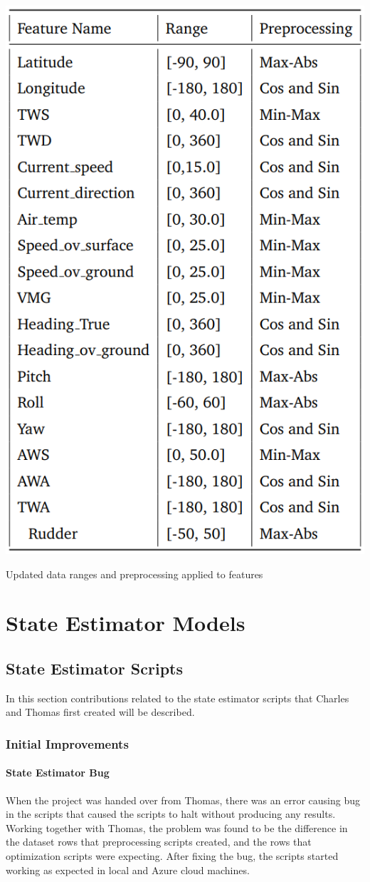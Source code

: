 \documentclass[12pt,twoside]{report}
\begin{document}
\begin{table}[h]
\centering
\includegraphics[width = 0.65\hsize]{figures/data scaling.png}
\caption{Updated data ranges and preprocessing applied to features}
\label{tbl:scripts-scaling}
\end{table}

\chapter{State Estimator Models}

\section{State Estimator Scripts}
In this section contributions related to the state estimator scripts that Charles and Thomas first created will be described.

\subsection{Initial Improvements}

\subsubsection{State Estimator Bug}
When the project was handed over from Thomas, there was an error causing bug in the scripts that caused the scripts to halt without producing any results. Working together with Thomas, the problem was found to be the difference in the dataset rows that preprocessing scripts created, and the rows that optimization scripts were expecting. After fixing the bug, the scripts started working as expected in local and Azure cloud machines.
\end{document}
